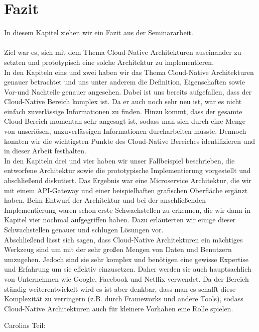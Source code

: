 \chapter{Fazit}
In diesem Kapitel ziehen wir ein Fazit aus der Seminararbeit.\\
\\
Ziel war es, sich mit dem Thema Cloud-Native Architekturen auseinander zu setzten und prototypisch eine solche Architektur zu implementieren.\\
In den Kapiteln eins und zwei haben wir das Thema Cloud-Native Architekturen genauer betrachtet und uns unter anderem die Definition, Eigenschaften sowie Vor-und Nachteile genauer angesehen. Dabei ist uns bereits aufgefallen, dass der Cloud-Native Bereich komplex ist. Da er auch noch sehr neu ist, war es nicht einfach zuverlässige Informationen zu finden. Hinzu kommt, dass der gesamte Cloud Bereich momentan sehr angesagt ist, sodass man sich durch eine Menge von unseriösen, unzuverlässigen Informationen durcharbeiten musste. Dennoch konnten wir die wichtigsten Punkte des Cloud-Native Bereiches identifizieren und in dieser Arbeit festhalten.\\
In den Kapiteln drei und vier haben wir unser Fallbeispiel beschrieben, die entworfene Architektur sowie die prototypische Implementierung vorgestellt und abschließend diskutiert. Das Ergebnis war eine Microservice Architektur, die wir mit einem API-Gateway und einer beispielhaften grafischen Oberfläche ergänzt haben. Beim Entwurf der Architektur und bei der anschließenden Implementierung waren schon erste Schwachstellen zu erkennen, die wir dann in Kapitel vier nochmal aufgegriffen haben. Dazu erläuterten wir einige dieser Schwachstellen genauer und schlugen Lösungen vor.\\
Abschließend lässt sich sagen, dass Cloud-Native Architekturen ein mächtiges Werkzeug sind um mit der sehr großen Mengen von Daten und Benutzern umzugehen. Jedoch sind sie sehr komplex und benötigen eine gewisse Expertise und Erfahrung um sie effektiv einzusetzen. Daher werden sie auch hauptsachlich von Unternehmen wie Google, Facebook und Netflix verwendet. Da der Bereich ständig weiterentwickelt wird es ist aber denkbar, dass man es schafft diese Komplexität zu verringern (z.B. durch Frameworks und andere Tools), sodass Cloud-Native Architekturen auch für kleinere Vorhaben eine Rolle spielen.


Carolins Teil:

